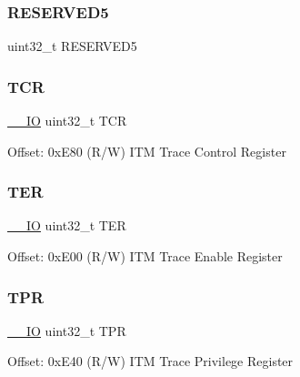 \mbox{\label{struct_i_t_m___type_a2e4356b97fabed41bcbf29ec48cdb3de}} 
\subsubsection{\texorpdfstring{RESERVED5}{RESERVED5}}
{\footnotesize\ttfamily uint32\+\_\+t R\+E\+S\+E\+R\+V\+E\+D5}

\mbox{\label{struct_i_t_m___type_ae9dd9282fab299d0cd6e119564688e53}} 
\subsubsection{\texorpdfstring{TCR}{TCR}}
{\footnotesize\ttfamily \mbox{\hyperlink{core__sc300_8h_aec43007d9998a0a0e01faede4133d6be}{\+\_\+\+\_\+\+IO}} uint32\+\_\+t T\+CR}

Offset\+: 0x\+E80 (R/W) I\+TM Trace Control Register \mbox{\label{struct_i_t_m___type_a8ffb3c6b706b03334f6fe37ef5d8b165}} 
\subsubsection{\texorpdfstring{TER}{TER}}
{\footnotesize\ttfamily \mbox{\hyperlink{core__sc300_8h_aec43007d9998a0a0e01faede4133d6be}{\+\_\+\+\_\+\+IO}} uint32\+\_\+t T\+ER}

Offset\+: 0x\+E00 (R/W) I\+TM Trace Enable Register \mbox{\label{struct_i_t_m___type_a72bb9b7d61fe3262cd2a6070a7bd5b69}} 
\subsubsection{\texorpdfstring{TPR}{TPR}}
{\footnotesize\ttfamily \mbox{\hyperlink{core__sc300_8h_aec43007d9998a0a0e01faede4133d6be}{\+\_\+\+\_\+\+IO}} uint32\+\_\+t T\+PR}

Offset\+: 0x\+E40 (R/W) I\+TM Trace Privilege Register \mbox{\label{struct_i_t_m___type_ae8d499140220fa6d4eab1da7262bf08e}} 
